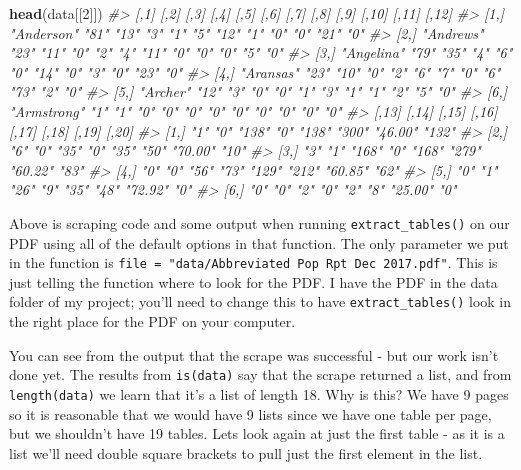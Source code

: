 \documentclass[
  12pt,
]{book}
\newenvironment{Shaded}{\begin{snugshade}}{\end{snugshade}}
\newcommand{\CommentTok}[1]{\textcolor[rgb]{0.56,0.35,0.01}{\textit{#1}}}
\newcommand{\DecValTok}[1]{\textcolor[rgb]{0.00,0.00,0.81}{#1}}
\newcommand{\KeywordTok}[1]{\textcolor[rgb]{0.13,0.29,0.53}{\textbf{#1}}}
\newcommand{\NormalTok}[1]{#1}
\begin{document}
\begin{Shaded}
\begin{Highlighting}[]
\KeywordTok{head}\NormalTok{(data[[}\DecValTok{2}\NormalTok{]])}
\CommentTok{\#>      [,1]        [,2] [,3] [,4] [,5] [,6] [,7] [,8] [,9] [,10] [,11] [,12]}
\CommentTok{\#> [1,] "Anderson"  "81" "13" "3"  "1"  "5"  "12" "1"  "0"  "0"   "21"  "0"  }
\CommentTok{\#> [2,] "Andrews"   "23" "11" "0"  "2"  "4"  "11" "0"  "0"  "0"   "5"   "0"  }
\CommentTok{\#> [3,] "Angelina"  "79" "35" "4"  "6"  "0"  "14" "0"  "3"  "0"   "23"  "0"  }
\CommentTok{\#> [4,] "Aransas"   "23" "10" "0"  "2"  "6"  "7"  "0"  "6"  "73"  "2"   "0"  }
\CommentTok{\#> [5,] "Archer"    "12" "3"  "0"  "0"  "1"  "3"  "1"  "1"  "2"   "5"   "0"  }
\CommentTok{\#> [6,] "Armstrong" "1"  "1"  "0"  "0"  "0"  "0"  "0"  "0"  "0"   "0"   "0"  }
\CommentTok{\#>      [,13] [,14] [,15] [,16] [,17] [,18] [,19]   [,20]}
\CommentTok{\#> [1,] "1"   "0"   "138" "0"   "138" "300" "46.00" "132"}
\CommentTok{\#> [2,] "6"   "0"   "35"  "0"   "35"  "50"  "70.00" "10" }
\CommentTok{\#> [3,] "3"   "1"   "168" "0"   "168" "279" "60.22" "83" }
\CommentTok{\#> [4,] "0"   "0"   "56"  "73"  "129" "212" "60.85" "62" }
\CommentTok{\#> [5,] "0"   "1"   "26"  "9"   "35"  "48"  "72.92" "0"  }
\CommentTok{\#> [6,] "0"   "0"   "2"   "0"   "2"   "8"   "25.00" "0"}
\end{Highlighting}
\end{Shaded}

Above is scraping code and some output when running \texttt{extract\_tables()} on our PDF using all of the default options in that function. The only parameter we put in the function is \texttt{file\ =\ "data/Abbreviated\ Pop\ Rpt\ Dec\ 2017.pdf"}. This is just telling the function where to look for the PDF. I have the PDF in the data folder of my project; you'll need to change this to have \texttt{extract\_tables()} look in the right place for the PDF on your computer.

You can see from the output that the scrape was successful - but our work isn't done yet. The results from \texttt{is(data)} say that the scrape returned a list, and from \texttt{length(data)} we learn that it's a list of length 18. Why is this? We have 9 pages so it is reasonable that we would have 9 lists since we have one table per page, but we shouldn't have 19 tables. Lets look again at just the first table - as it is a list we'll need double square brackets to pull just the first element in the list.
\end{document}
